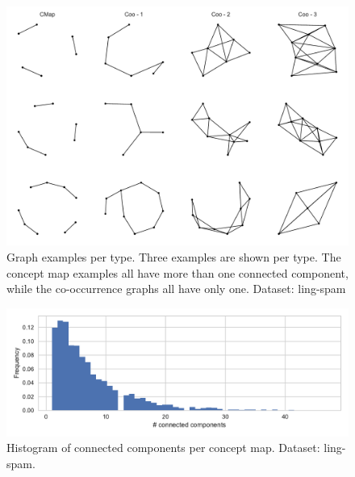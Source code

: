 \begin{figure}[h]
\centering
\includegraphics[width=0.6\linewidth]{assets/figures/graph-examples.pdf}
\caption{Graph examples per type. Three examples are shown per type. The concept map examples all have more than one connected component, while the co-occurrence graphs all have only one. Dataset: ling-spam}
\end{figure}

\begin{figure}[h]
\centering
\includegraphics[width=0.8\linewidth]{assets/figures/hist-connected-components-ling-spam-CMap.pdf}
\caption{Histogram of connected components per concept map. Dataset: ling-spam.}
\end{figure}


